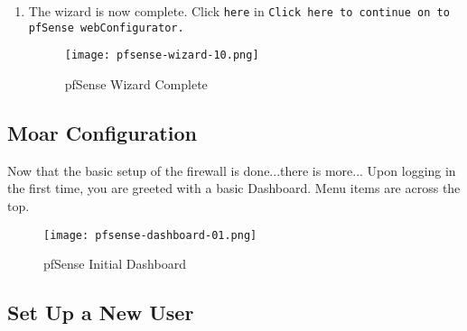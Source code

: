 \begin{enumerate}
 \item The wizard is now complete. Click \texttt{here} in \texttt{Click here to continue on to pfSense webConfigurator.}
\begin{figure}[h!]
\begin{center}
\texttt{[image: pfsense-wizard-10.png]}
 \caption{pfSense Wizard Complete}
 \label{fig:pfsense-wizard-10}
\end{center}
\end{figure}

\end{enumerate}

\subsection{Moar Configuration}
Now that the basic setup of the firewall is done...there is more...
Upon logging in the first time, you are greeted with a basic Dashboard. Menu items are across the top.
\begin{figure}[h!]
\begin{center}
\texttt{[image: pfsense-dashboard-01.png]}
 \caption{pfSense Initial Dashboard}
 \label{fig:pfsense-dashboard-01}
\end{center}
\end{figure}


\subsection{Set Up a New User}

